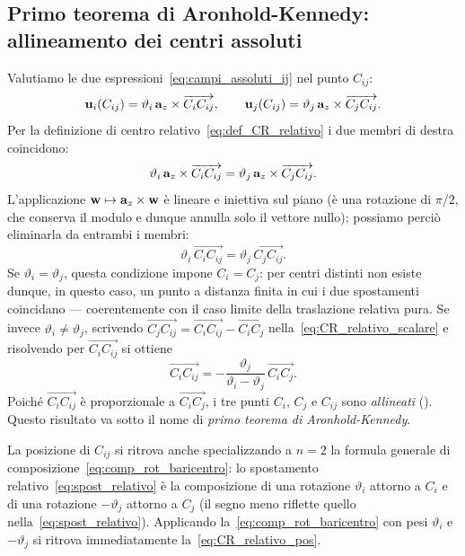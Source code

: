 \subsection{Primo teorema di Aronhold-Kennedy: allineamento dei centri assoluti}
Valutiamo le due espressioni~\eqref{eq:campi_assoluti_ij} nel punto $C_{ij}$:
\begin{equation}
	\mathbf{u}_i(C_{ij}) = \vartheta_i\,\mathbf{a}_z\times\overrightarrow{C_iC_{ij}}, \qquad
	\mathbf{u}_j(C_{ij}) = \vartheta_j\,\mathbf{a}_z\times\overrightarrow{C_jC_{ij}}.
\end{equation}
Per la definizione di centro relativo~\eqref{eq:def_CR_relativo} i due membri di
destra coincidono:
\begin{equation}
	\vartheta_i\,\mathbf{a}_z\times\overrightarrow{C_iC_{ij}}
	= \vartheta_j\,\mathbf{a}_z\times\overrightarrow{C_jC_{ij}}.
\end{equation}
L'applicazione $\mathbf{w}\mapsto\mathbf{a}_z\times\mathbf{w}$ è lineare e iniettiva sul piano (è una
rotazione di $\pi/2$, che conserva il modulo e dunque annulla solo il vettore
nullo); possiamo perciò eliminarla da entrambi i membri:
\begin{equation}\label{eq:CR_relativo_scalare}
	\vartheta_i\,\overrightarrow{C_iC_{ij}}
	= \vartheta_j\,\overrightarrow{C_jC_{ij}}.
\end{equation}
Se $\vartheta_i=\vartheta_j$, questa condizione impone $C_i=C_j$: per centri
distinti non esiste dunque, in questo caso, un punto a distanza finita in cui i due
spostamenti coincidano --- coerentemente con il caso limite della traslazione
relativa pura. Se invece $\vartheta_i\neq\vartheta_j$, scrivendo
$\overrightarrow{C_jC_{ij}} = \overrightarrow{C_iC_{ij}} - \overrightarrow{C_iC_j}$
nella~\eqref{eq:CR_relativo_scalare} e risolvendo per $\overrightarrow{C_iC_{ij}}$
si ottiene
\begin{equation}\label{eq:CR_relativo_pos}
	\overrightarrow{C_i C_{ij}}
	= -\frac{\vartheta_j}{\vartheta_i - \vartheta_j}\,
	\overrightarrow{C_i C_j}.
\end{equation}
Poiché $\overrightarrow{C_iC_{ij}}$ è proporzionale a $\overrightarrow{C_iC_j}$, i
tre punti $C_i$, $C_j$ e $C_{ij}$ sono \textit{allineati}
(). Questo risultato va sotto il nome di \textit{primo teorema di Aronhold-Kennedy}. 

\begin{oss}
	La posizione di $C_{ij}$ si ritrova anche specializzando a $n=2$ la formula
	generale di composizione~\eqref{eq:comp_rot_baricentro}: lo spostamento
	relativo~\eqref{eq:spost_relativo} è la composizione di una rotazione
	$\vartheta_i$ attorno a $C_i$ e di una rotazione $-\vartheta_j$ attorno a
	$C_j$ (il segno meno riflette quello nella~\eqref{eq:spost_relativo}).
	Applicando la~\eqref{eq:comp_rot_baricentro} con pesi $\vartheta_i$ e
	$-\vartheta_j$ si ritrova immediatamente la~\eqref{eq:CR_relativo_pos}.
\end{oss}


